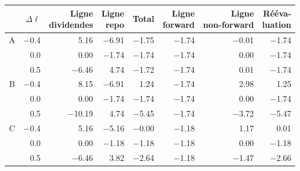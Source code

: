 {\small\begin{tabular}{crrrrrrr}
\toprule
 & $\Delta\ell$ & \makecell{Ligne\\dividendes} & \makecell{Ligne\\repo} & Total & \makecell{Ligne\\forward} & \makecell{Ligne\\non-forward} & \makecell{Rééva-\\luation} \\
\midrule
A & \num[retain-explicit-plus]{-0.4} & \num{5.16} & \num{-6.91} & \num{-1.75} & \num{-1.74} & \num{-0.01} & \num{-1.74} \\
 & \num{0.0} & \num{0.00} & \num{-1.74} & \num{-1.74} & \num{-1.74} & \num{0.00} & \num{-1.74} \\
 & \num[retain-explicit-plus]{+0.5} & \num{-6.46} & \num{4.74} & \num{-1.72} & \num{-1.74} & \num{0.01} & \num{-1.74} \\
\midrule
B & \num[retain-explicit-plus]{-0.4} & \num{8.15} & \num{-6.91} & \num{1.24} & \num{-1.74} & \num{2.98} & \num{1.25} \\
 & \num{0.0} & \num{0.00} & \num{-1.74} & \num{-1.74} & \num{-1.74} & \num{0.00} & \num{-1.74} \\
 & \num[retain-explicit-plus]{+0.5} & \num{-10.19} & \num{4.74} & \num{-5.45} & \num{-1.74} & \num{-3.72} & \num{-5.47} \\
\midrule
C & \num[retain-explicit-plus]{-0.4} & \num{5.16} & \num{-5.16} & \num{-0.00} & \num{-1.18} & \num{1.17} & \num{0.01} \\
 & \num{0.0} & \num{0.00} & \num{-1.18} & \num{-1.18} & \num{-1.18} & \num{0.00} & \num{-1.18} \\
 & \num[retain-explicit-plus]{+0.5} & \num{-6.46} & \num{3.82} & \num{-2.64} & \num{-1.18} & \num{-1.47} & \num{-2.66} \\
\bottomrule
\end{tabular}}
